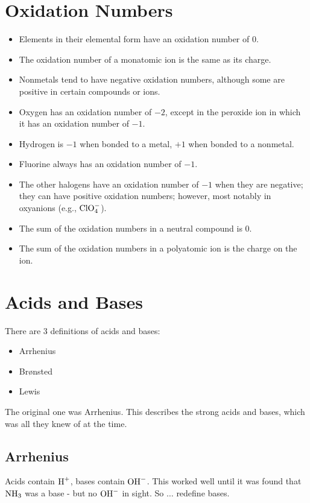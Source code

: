 \documentclass[
	chapter=4
]{chem122notes}
\begin{document}
\section{Oxidation Numbers}\label{sec:oxidation-numbers}
\begin{itemize}
	\item Elements in their elemental form have an oxidation number of 0.
	\item The oxidation number of a monatomic ion is the same as its charge.
	\item Nonmetals tend to have negative oxidation numbers, although some are positive in certain compounds or ions.
	\item Oxygen has an oxidation number of $-2$, except in the peroxide ion in which it has an oxidation number of $-1$.
	\item Hydrogen is $-1$ when bonded to a metal, $+1$ when bonded to a nonmetal.
	\item Fluorine always has an oxidation number of $-1$.
	\item The other halogens have an oxidation number of $-1$ when they are negative; they can have positive oxidation numbers; however, most notably in oxyanions (e.g., $\element{Cl}\element{O}[4]^{-}$).
	\item The sum of the oxidation numbers in a neutral compound is 0.
	\item The sum of the oxidation numbers in a polyatomic ion is the charge on the ion.
\end{itemize}

\section{Acids and Bases}\label{sec:acids-and-bases}
There are 3 definitions of acids and bases:
\begin{itemize}
	\item Arrhenius
	\item Br\o{}nsted
	\item Lewis
\end{itemize}
The original one was Arrhenius.
This describes the strong acids and bases, which was all they knew of at the time.

\subsection{Arrhenius}\label{subsec:arrhenius}
Acids contain $\element{H}^{+}$, bases contain $\element{OH}^{-}$.
This worked well until it was found that $\element{N}\element{H}[3]$ was a base - but no $\element{O}\element{H}^{-}$ in sight.
So $\dots$ redefine bases.
\end{document}
